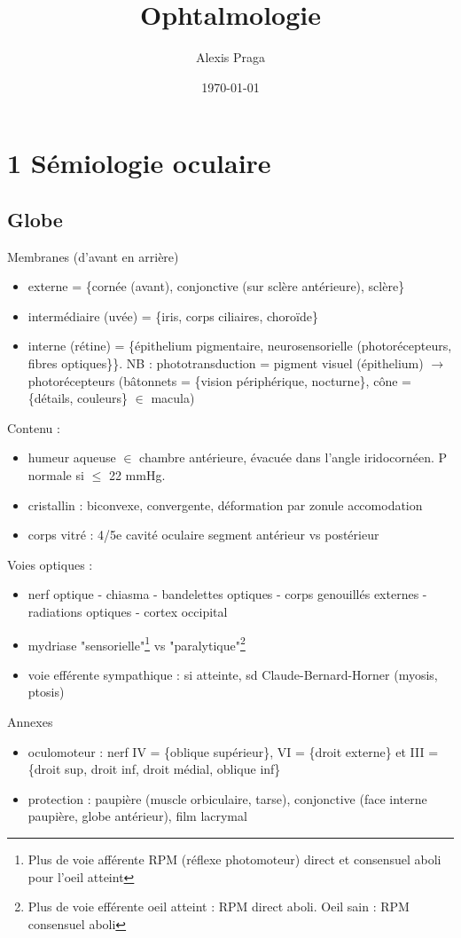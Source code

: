 \documentclass[11pt]{article}
\author{Alexis Praga}
\date{\today}
\title{Ophtalmologie}
\begin{document}
\maketitle
\tableofcontents


\section{1 Sémiologie oculaire}
\label{sec:orgb0c8f1c}
\subsection{Globe}
\label{sec:org774138d}
Membranes (d'avant en arrière)
\begin{itemize}
\item externe = \{cornée (avant), conjonctive (sur sclère antérieure), sclère\}
\item intermédiaire (uvée) = \{iris, corps ciliaires, choroïde\}
\item interne (rétine) = \{épithelium pigmentaire, neurosensorielle (photorécepteurs,
fibres optiques\}\}. NB : phototransduction = pigment visuel
(épithelium) \(\rightarrow\) photorécepteurs (bâtonnets = \{vision périphérique,
nocturne\}, cône = \{détails, couleurs\} \(\in\) macula)
\end{itemize}
Contenu : 
\begin{itemize}
\item humeur aqueuse \(\in\) chambre antérieure, évacuée dans l'angle iridocornéen. P
normale si \(\le\) 22 mmHg.
\item cristallin : biconvexe, convergente, déformation par zonule \thus accomodation
\item corps vitré : 4/5e cavité oculaire \thus segment antérieur vs postérieur
\end{itemize}
Voies optiques : 
\begin{itemize}
\item nerf optique - chiasma - bandelettes optiques - corps genouillés externes - radiations optiques - cortex occipital
\item mydriase "sensorielle"\footnote{Plus de voie afférente  \thus RPM (réflexe photomoteur) direct et
consensuel aboli pour l'oeil atteint} vs "paralytique"\footnote{Plus de voie efférente \thus oeil atteint : RPM direct aboli. Oeil sain : RPM consensuel aboli}
\item voie efférente sympathique : si atteinte, sd Claude-Bernard-Horner (myosis, ptosis)
\end{itemize}
Annexes
\begin{itemize}
\item oculomoteur : nerf IV = \{oblique supérieur\}, VI = \{droit externe\} et III =
\{droit sup, droit inf, droit médial, oblique inf\}
\item protection : paupière (muscle orbiculaire, tarse), conjonctive (face interne
paupière, globe antérieur), film lacrymal
\end{itemize}
\end{document}
